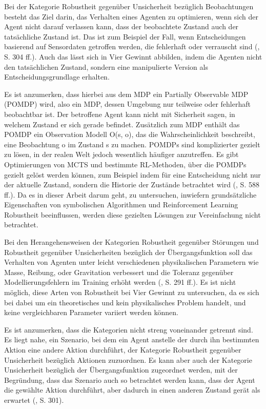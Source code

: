 Bei der Kategorie Robustheit gegenüber Unsicherheit bezüglich Beobachtungen besteht das Ziel darin, das Verhalten eines Agenten zu optimieren, wenn sich der Agent nicht darauf verlassen kann, dass der beobachtete Zustand auch der tatsächliche Zustand ist. Das ist zum Beispiel der Fall, wenn Entscheidungen basierend auf Sensordaten getroffen werden, die fehlerhaft oder verrauscht sind (\cite{Moos.2022}, S. 304 ff.). Auch das lässt sich in Vier Gewinnt abbilden, indem die Agenten nicht den tatsächlichen Zustand, sondern eine manipulierte Version als Entscheidungsgrundlage erhalten.

Es ist anzumerken, dass hierbei aus dem MDP ein Partially Observable MDP (POMDP) wird, also ein MDP, dessen Umgebung nur teilweise oder fehlerhaft beobachtbar ist. Der betroffene Agent kann nicht mit Sicherheit sagen, in welchem Zustand er sich gerade befindet. Zusätzlich zum MDP enthält das POMDP ein Observation Modell O(s, o), das die Wahrscheinlichkeit beschreibt, eine Beobachtung o im Zustand s zu machen. POMDPs sind komplizierter gezielt zu lösen, in der realen Welt jedoch wesentlich häufiger anzutreffen. Es gibt Optimierungen von MCTS und bestimmte RL-Methoden, über die POMDPs gezielt gelöst werden können, zum Beispiel indem für eine Entscheidung nicht nur der aktuelle Zustand, sondern die Historie der Zustände betrachtet wird (\cite{Russell.2020}, S. 588 ff.). Da es in dieser Arbeit darum geht, zu untersuchen, inwiefern grundsätzliche Eigenschaften von symbolischen Algorithmen und Reinforcement Learning Robustheit beeinflussen, werden diese gezielten Lösungen zur Vereinfachung nicht betrachtet.

Bei den Herangehensweisen der Kategorien Robustheit gegenüber Störungen und Robustheit gegenüber Unsicherheiten bezüglich der Übergangsfunktion soll das Verhalten von Agenten unter leicht verschiedenen physikalischen Parametern wie Masse, Reibung, oder Gravitation verbessert und die Toleranz gegenüber Modellierungsfehlern im Training erhöht werden (\cite{Moos.2022}, S. 291 ff.). Es ist nicht möglich, diese Arten von Robustheit bei Vier Gewinnt zu untersuchen, da es sich bei dabei um ein theoretisches und kein physikalisches Problem handelt, und keine vergleichbaren Parameter variiert werden können.

Es ist anzumerken, dass die Kategorien nicht streng voneinander getrennt sind. Es liegt nahe, ein Szenario, bei dem ein Agent anstelle der durch ihn bestimmten Aktion eine andere Aktion durchführt, der Kategorie Robustheit gegenüber Unsicherheit bezüglich Aktionen zuzuordnen. Es kann aber auch der Kategorie Unsicherheit bezüglich der Übergangsfunktion zugeordnet werden, mit der Begründung, dass das Szenario auch so betrachtet werden kann, dass der Agent die gewählte Aktion durchführt, aber dadurch in einen anderen Zustand gerät als erwartet (\cite{Moos.2022}, S. 301).


